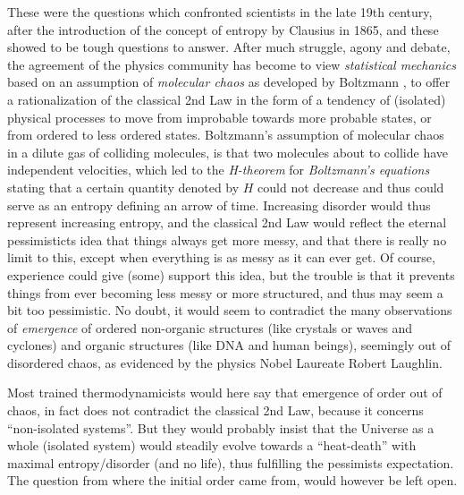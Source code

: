 These were the questions which confronted scientists
in the late 19th century, after the introduction  of the concept of entropy
by Clausius in 1865, and these showed to be tough questions to answer.
After much struggle, agony and debate, the agreement of the
physics community has become to
view \emph{statistical mechanics} based on an
assumption of \emph{molecular chaos} as developed by Boltzmann
\cite{boltzmann},
to offer a rationalization of the classical 2nd Law in the form
of a tendency of (isolated) physical processes to move from improbable towards
more probable states, or from ordered to less ordered states.
Boltzmann's assumption of molecular chaos in a dilute gas of colliding
molecules, is that two molecules about to collide have
independent velocities, which led to the \emph{H-theorem}
for \emph{Boltzmann's equations} stating that a certain quantity
denoted by $H$ could not decrease and thus could serve as
an entropy defining an arrow of time.
Increasing disorder would thus represent increasing entropy, and the
classical 2nd Law would reflect the eternal pessimisticts idea that things
always get more messy, and
that there is really no limit to this,
except when everything is as messy as it can ever get. Of course, experience
could give (some) support this idea, but the trouble is that it prevents things
from ever becoming less messy or more structured, and
thus may seem a bit too pessimistic.
No doubt, it would seem to contradict the many observations of
\emph{emergence} of ordered non-organic structures (like crystals or
waves and cyclones) and organic structures (like DNA and human beings),
seemingly out of disordered chaos, as evidenced by the physics
Nobel Laureate Robert Laughlin.%

Most trained thermodynamicists
would here say that emergence of order
out of chaos, in fact does not contradict the classical 2nd Law,
because it concerns
``non-isolated systems''. But they would probably insist that
the Universe as a whole (isolated system) would steadily evolve towards a
``heat-death'' with maximal entropy/disorder (and no life), thus
fulfilling the pessimists expectation. The question from where the
initial order came from, would however be left open.

